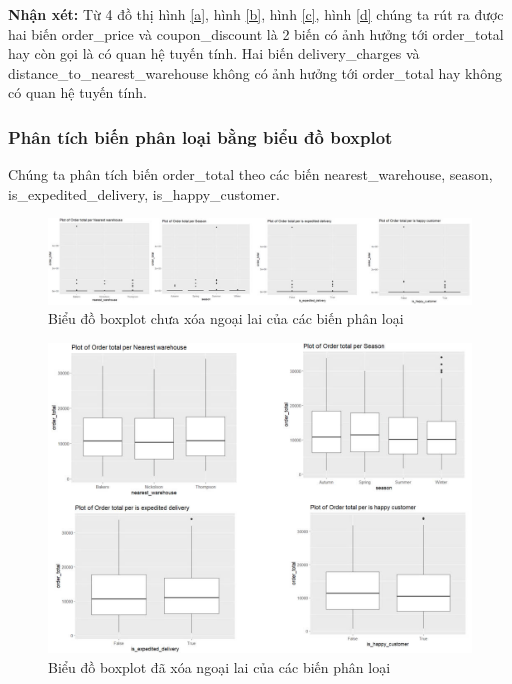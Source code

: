 \textbf{Nhận xét:} Từ 4 đồ thị hình \ref{a}, hình \ref{b}, hình \ref{c}, hình \ref{d} chúng ta rút ra được hai biến order\_price và coupon\_discount là 2 biến có ảnh hưởng tới order\_total hay còn gọi là có quan hệ tuyến tính. Hai biến delivery\_charges và distance\_to\_nearest\_warehouse không có ảnh hưởng tới order\_total hay không có quan hệ tuyến tính.

\subsubsection{Phân tích biến phân loại bằng biểu đồ boxplot}
Chúng ta phân tích biến order\_total theo các biến nearest\_warehouse, season, is\_expedited\_delivery, is\_happy\_customer.
\begin{figure}[!htbp]
    \centering
    \includegraphics[width=1\linewidth]{graphics/bang13.jpg}
    \caption{Biểu đồ boxplot chưa xóa ngoại lai của các biến phân loại}
\end{figure}
\begin{figure}[!htbp]
    \centering
 \includegraphics[width=0.9\linewidth]{graphics/bang14.jpg}
 \caption{Biểu đồ boxplot đã xóa ngoại lai của các biến phân loại}
 \label{e}
\end{figure}


